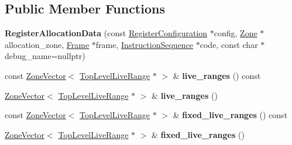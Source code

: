 \subsection*{Public Member Functions}
\begin{DoxyCompactItemize}
\item 
{\bfseries Register\+Allocation\+Data} (const \hyperlink{classv8_1_1internal_1_1_register_configuration}{Register\+Configuration} $\ast$config, \hyperlink{classv8_1_1internal_1_1_zone}{Zone} $\ast$allocation\+\_\+zone, \hyperlink{classv8_1_1internal_1_1compiler_1_1_frame}{Frame} $\ast$frame, \hyperlink{classv8_1_1internal_1_1compiler_1_1_instruction_sequence}{Instruction\+Sequence} $\ast$code, const char $\ast$debug\+\_\+name=nullptr)\hypertarget{classv8_1_1internal_1_1compiler_1_1_register_allocation_data_a4309276ff4c1efb291394c3800965d6e}{}\label{classv8_1_1internal_1_1compiler_1_1_register_allocation_data_a4309276ff4c1efb291394c3800965d6e}

\item 
const \hyperlink{classv8_1_1internal_1_1_zone_vector}{Zone\+Vector}$<$ \hyperlink{classv8_1_1internal_1_1compiler_1_1_top_level_live_range}{Top\+Level\+Live\+Range} $\ast$ $>$ \& {\bfseries live\+\_\+ranges} () const \hypertarget{classv8_1_1internal_1_1compiler_1_1_register_allocation_data_a5e082fc58658e88d73d4fec42e6a43a5}{}\label{classv8_1_1internal_1_1compiler_1_1_register_allocation_data_a5e082fc58658e88d73d4fec42e6a43a5}

\item 
\hyperlink{classv8_1_1internal_1_1_zone_vector}{Zone\+Vector}$<$ \hyperlink{classv8_1_1internal_1_1compiler_1_1_top_level_live_range}{Top\+Level\+Live\+Range} $\ast$ $>$ \& {\bfseries live\+\_\+ranges} ()\hypertarget{classv8_1_1internal_1_1compiler_1_1_register_allocation_data_a56201d7e6d4e0efa459955af777d07e3}{}\label{classv8_1_1internal_1_1compiler_1_1_register_allocation_data_a56201d7e6d4e0efa459955af777d07e3}

\item 
const \hyperlink{classv8_1_1internal_1_1_zone_vector}{Zone\+Vector}$<$ \hyperlink{classv8_1_1internal_1_1compiler_1_1_top_level_live_range}{Top\+Level\+Live\+Range} $\ast$ $>$ \& {\bfseries fixed\+\_\+live\+\_\+ranges} () const \hypertarget{classv8_1_1internal_1_1compiler_1_1_register_allocation_data_a9ff0e794ed5f33cd82843a8183b96705}{}\label{classv8_1_1internal_1_1compiler_1_1_register_allocation_data_a9ff0e794ed5f33cd82843a8183b96705}

\item 
\hyperlink{classv8_1_1internal_1_1_zone_vector}{Zone\+Vector}$<$ \hyperlink{classv8_1_1internal_1_1compiler_1_1_top_level_live_range}{Top\+Level\+Live\+Range} $\ast$ $>$ \& {\bfseries fixed\+\_\+live\+\_\+ranges} ()\hypertarget{classv8_1_1internal_1_1compiler_1_1_register_allocation_data_a4d0612742fb55b48f4f9b307903649be}{}\label{classv8_1_1internal_1_1compiler_1_1_register_allocation_data_a4d0612742fb55b48f4f9b307903649be}


\end{DoxyCompactItemize}
